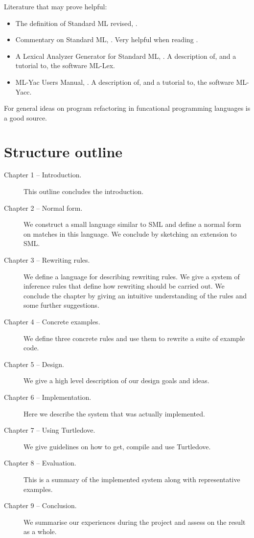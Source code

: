 \noindent
Literature that may prove helpful:

\begin{itemize}
\item The definition of Standard ML revised, \cite{SML97}.
\item Commentary on Standard ML, \cite{SMLCOMM}. Very helpful when reading
  \cite{SML97}.
\item A Lexical Analyzer Generator for Standard ML, \cite{MLLEX, ml-lex-yacc}. A description
  of, and a tutorial to, the software ML-Lex.
\item ML-Yac Users Manual, \cite{MLYACC, ml-lex-yacc}. A description of, and a tutorial to,
  the software ML-Yacc. 
\end{itemize}

For general ideas on program refactoring in funcational programming languages
\cite{HARE} is a good source.

\section{Structure outline}
\begin{description}
\item[Chapter 1 -- Introduction.]
  This outline concludes the introduction.
\item[Chapter 2 -- Normal form.]
  We construct a small language similar to SML and define a normal form on
  matches in this language. We conclude by sketching an extension to SML.
\item[Chapter 3 -- Rewriting rules.]
  We define a language for describing rewriting rules. We give a system of
  inference rules that define how rewriting should be carried out. We conclude
  the chapter by giving an intuitive understanding of the rules and some further
  suggestions.
\item[Chapter 4 -- Concrete examples.]
  We define three concrete rules and use them to rewrite a suite of example
  code.
\item[Chapter 5 -- Design.]
  We give a high level description of our design goals and ideas.
\item[Chapter 6 -- Implementation.]
  Here we describe the system that was actually implemented.
\item[Chapter 7 -- Using Turtledove.]
  We give guidelines on how to get, compile and use Turtledove.
\item[Chapter 8 -- Evaluation.]
  This is a summary of the implemented system along with representative examples.
\item[Chapter 9 -- Conclusion.]
  We summarise our experiences during the project and assess on the result as a
  whole.
\end{description}


